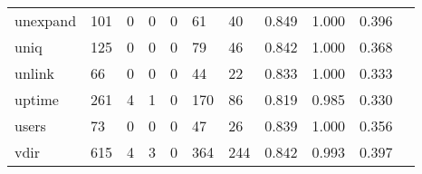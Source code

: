 \begin{longtable}{lp{1.2cm}p{1.2cm}p{1.2cm}p{1.2cm}p{1.2cm}p{1.2cm}p{1.2cm}p{1.2cm}p{1.2cm}p{1.2cm}}
unexpand  &                                   101 &                                                  0 &                                                  0 &                                                  0 &                                                 61 &                                                 40 &                                              0.849 &                                              1.000 &                                              0.396 \\
uniq      &                                   125 &                                                  0 &                                                  0 &                                                  0 &                                                 79 &                                                 46 &                                              0.842 &                                              1.000 &                                              0.368 \\
unlink    &                                    66 &                                                  0 &                                                  0 &                                                  0 &                                                 44 &                                                 22 &                                              0.833 &                                              1.000 &                                              0.333 \\
uptime    &                                   261 &                                                  4 &                                                  1 &                                                  0 &                                                170 &                                                 86 &                                              0.819 &                                              0.985 &                                              0.330 \\
users     &                                    73 &                                                  0 &                                                  0 &                                                  0 &                                                 47 &                                                 26 &                                              0.839 &                                              1.000 &                                              0.356 \\
vdir      &                                   615 &                                                  4 &                                                  3 &                                                  0 &                                                364 &                                                244 &                                              0.842 &                                              0.993 &                                              0.397 \\

\end{longtable}
